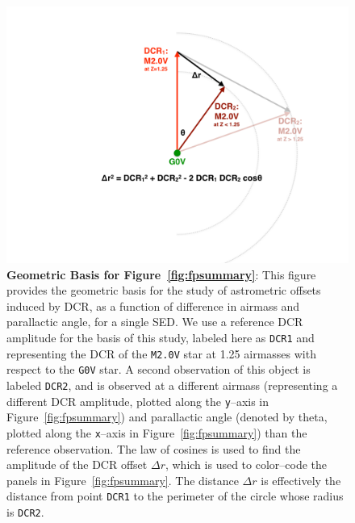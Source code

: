 \documentclass[DM,toc]{lsstdoc}
\begin{document}
\begin{figure}[!ht]
  \centering
  \includegraphics[width=1.0\textwidth]{DCR_001.png}
  \caption{{\bf Geometric Basis for Figure~\ref{fig:fpsummary}}: This
    figure provides the geometric basis for the study of astrometric
    offsets induced by DCR, as a function of difference in airmass and
    parallactic angle, for a single SED.  We use a reference DCR
    amplitude for the basis of this study, labeled here as {\tt DCR1}
    and representing the DCR of the {\tt M2.0V} star at 1.25 airmasses
    with respect to the {\tt G0V} star.  A second observation of this
    object is labeled {\tt DCR2}, and is observed at a different
    airmass (representing a different DCR amplitude, plotted along the
    {\tt y}--axis in Figure~\ref{fig:fpsummary}) and parallactic angle
    (denoted by theta, plotted along the {\tt x}--axis in
    Figure~\ref{fig:fpsummary}) than the reference observation.  The
    law of cosines is used to find the amplitude of the DCR offset
    $\Delta r$, which is used to color--code the panels in
    Figure~\ref{fig:fpsummary}.  The distance $\Delta r$ is
    effectively the distance from point {\tt DCR1} to the perimeter of
    the circle whose radius is {\tt DCR2}.}
  \label{fig:fpgeom}
\end{figure}
\end{document}
